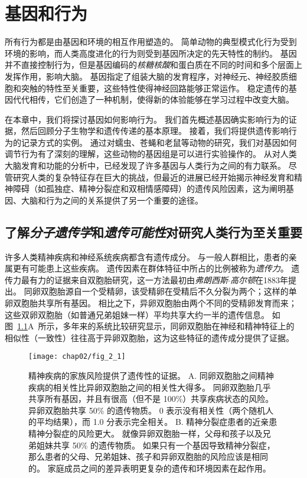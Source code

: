 \chapter{基因和行为} \label{chap:chap2}

所有行为都是由基因和环境的相互作用塑造的。
简单动物的典型模式化行为受到环境的影响，而人类高度进化的行为则受到基因所决定的先天特性的制约。
基因并不直接控制行为，但是基因编码的\textit{核糖核酸}和蛋白质在不同的时间和多个层面上发挥作用，影响大脑。
基因指定了组装大脑的发育程序，对神经元、神经胶质细胞和突触的特性至关重要，这些特性使得神经回路能够正常运作。
稳定遗传的基因代代相传，它们创造了一种机制，使得新的体验能够在学习过程中改变大脑。




在本章中，我们将探讨基因如何影响行为。
我们首先概述基因确实影响行为的证据，然后回顾分子生物学和遗传传递的基本原理。
接着，我们将提供遗传影响行为的记录方式的实例。
通过对蠕虫、苍蝇和老鼠等动物的研究，我们对基因如何调节行为有了深刻的理解，这些动物的基因组是可以进行实验操作的。
从对人类大脑发育和功能的分析中，已经发现了许多基因与人类行为之间的有力联系。
尽管研究人类的复杂特征存在巨大的挑战，但最近的进展已经开始揭示神经发育和精神障碍（如孤独症、精神分裂症和双相情感障碍）的遗传风险因素，这为阐明基因、大脑和行为之间的关系提供了另一个重要的途径。



\section{了解\textit{分子遗传学}和\textit{遗传可能性}对研究人类行为至关重要}

许多人类精神疾病和神经系统疾病都含有遗传成分。
与一般人群相比，患者的亲属更有可能患上这些疾病。
遗传因素在群体特征中所占的比例被称为\textit{遗传力}。
遗传力最有力的证据来自双胞胎研究，这一方法最初由\textit{弗朗西斯$\cdot$高尔顿}在1883年提出。
同卵双胞胎源自一个受精卵，该受精卵在受精后不久分裂为两个；这样的单卵双胞胎共享所有基因。
相比之下，异卵双胞胎由两个不同的受精卵发育而来；这些双卵双胞胎（如普通兄弟姐妹一样）平均共享大约一半的遗传信息。
如图~\ref{fig:2_1}A~所示，多年来的系统比较研究显示，同卵双胞胎在神经和精神特征上的相似性（一致性）往往高于异卵双胞胎，这为这些特征的遗传成分提供了证据。






\begin{figure}[htbp]
	\centering
	\texttt{[image: chap02/fig\_2\_1]}
	\caption{精神疾病的家族风险提供了遗传性的证据。
		A. 同卵双胞胎之间精神疾病的相关性比异卵双胞胎之间的相关性大得多。
		同卵双胞胎几乎共享所有基因，并且有很高（但不是 100\%）共享疾病状态的风险。
		异卵双胞胎共享 50\% 的遗传物质。
		0 表示没有相关性（两个随机人的平均结果），而 1.0 分表示完全相关\cite{mcgue1998genetic}。
		B. 精神分裂症患者的近亲患精神分裂症的风险更大。
		就像异卵双胞胎一样，父母和孩子以及兄弟姐妹共享 50\% 的遗传物质。
		如果只有一个基因导致精神分裂症，那么患者的父母、兄弟姐妹、孩子和异卵双胞胎的风险应该是相同的。 
		家庭成员之间的差异表明更复杂的遗传和环境因素在起作用\cite{gottesman1991schizophrenia}。}
	\label{fig:2_1}
\end{figure}


